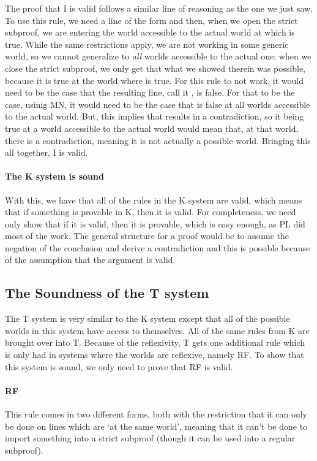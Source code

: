 The proof that \ediamond I is valid follows a similar line of reasoning as the one we just saw. To use this rule, we need a line of the form \ediamond{} and then, when we open the strict subproof, we are entering the world accessible to the actual world at which  is true. While the same restrictions apply, we are not working in some generic world, so we cannot generalize to \emph{all} worlds accessible to the actual one; when we close the strict subproof, we only get that what we showed therein was possible, because it is true at the world where  is true. For this rule to not work, it would need to be the case that the resulting line, call it \ediamond{}, is false. For that to be the case, usinig MN, it would need to be the case that  is false at all worlds accessible to the actual world. But, this implies that  results in a contradiction, so it being true at a world accessible to the actual world would mean that, at that world, there is a contradiction, meaning it is not actually a possible world. Bringing this all together, \ediamond I is valid. 

\paragraph{The K system is sound}
With this, we have that all of the rules in the K system are valid, which means that if something is provable in K, then it is valid. For completeness, we need only show that if it is valid, then it is provable, which is easy enough, as PL did most of the work. The general structure for a proof would be to assume the negation of the conclusion and derive a contradiction and this is possible because of the assumption that the argument is valid.   

\subsection{The Soundness of the T system}
The T system is very similar to the K system except that all of the possible worlds in this system have access to themselves. All of the same rules from K are brought over into T. Because of the reflexivity, T gets one additional rule which is only had in systems where the worlds are reflexive, namely RF. To show that this system is sound, we only need to prove that RF is valid. 

\paragraph{RF}
This rule comes in two different forms, both with the restriction that it can only be done on lines which are `at the same world', meaning that it can't be done to import something into a strict subproof (though it can be used into a regular subproof). 

